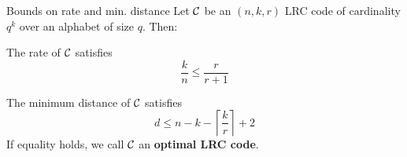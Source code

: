     
\begin{frame}{Bounds on rate and min. distance}
	Let $\mathcal{C}$ be an $(n,k,r)$ LRC code of cardinality $q^k$ over an alphabet of size $q$. Then:
    \begin{thm}
        The rate of $\mathcal{C}$ satisfies
        $$ \frac{k}{n} \leq \frac{r}{r+1} $$
    \end{thm}
    
    \begin{thm}
        The minimum distance of $\mathcal{C}$ satisfies
            $$d \leq n - k - \left\lceil \frac{k}{r} \right\rceil + 2$$
        If equality holds, we call $\mathcal{C}$ an \textbf{optimal LRC code}.
    \end{thm}
\end{frame}